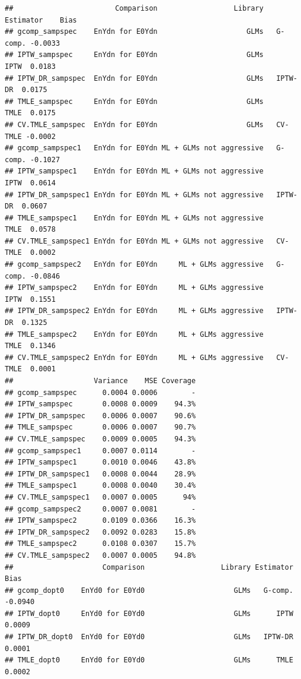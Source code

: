 \documentclass[11pt]{article}\usepackage[]{graphicx}\usepackage[]{color}
\makeatletter
\newenvironment{kframe}{%
 \def\at@end@of@kframe{}%
 \ifinner\ifhmode%
  \def\at@end@of@kframe{\end{minipage}}%
  \begin{minipage}{\columnwidth}%
 \fi\fi%
 \def\FrameCommand##1{\hskip\@totalleftmargin \hskip-\fboxsep
 \colorbox{shadecolor}{##1}\hskip-\fboxsep
     \hskip-\linewidth \hskip-\@totalleftmargin \hskip\columnwidth}%
 \MakeFramed {\advance\hsize-\width
   \@totalleftmargin\z@ \linewidth\hsize
   \@setminipage}}%
 {\par\unskip\endMakeFramed%
 \at@end@of@kframe}
\newenvironment{knitrout}{}{} %
\makeatother
\begin{document}
\begin{knitrout}
\color{fgcolor}\begin{kframe}
\begin{verbatim}
##                        Comparison                  Library Estimator    Bias
## gcomp_sampspec    EnYdn for E0Ydn                     GLMs   G-comp. -0.0033
## IPTW_sampspec     EnYdn for E0Ydn                     GLMs      IPTW  0.0183
## IPTW_DR_sampspec  EnYdn for E0Ydn                     GLMs   IPTW-DR  0.0175
## TMLE_sampspec     EnYdn for E0Ydn                     GLMs      TMLE  0.0175
## CV.TMLE_sampspec  EnYdn for E0Ydn                     GLMs   CV-TMLE -0.0002
## gcomp_sampspec1   EnYdn for E0Ydn ML + GLMs not aggressive   G-comp. -0.1027
## IPTW_sampspec1    EnYdn for E0Ydn ML + GLMs not aggressive      IPTW  0.0614
## IPTW_DR_sampspec1 EnYdn for E0Ydn ML + GLMs not aggressive   IPTW-DR  0.0607
## TMLE_sampspec1    EnYdn for E0Ydn ML + GLMs not aggressive      TMLE  0.0578
## CV.TMLE_sampspec1 EnYdn for E0Ydn ML + GLMs not aggressive   CV-TMLE  0.0002
## gcomp_sampspec2   EnYdn for E0Ydn     ML + GLMs aggressive   G-comp. -0.0846
## IPTW_sampspec2    EnYdn for E0Ydn     ML + GLMs aggressive      IPTW  0.1551
## IPTW_DR_sampspec2 EnYdn for E0Ydn     ML + GLMs aggressive   IPTW-DR  0.1325
## TMLE_sampspec2    EnYdn for E0Ydn     ML + GLMs aggressive      TMLE  0.1346
## CV.TMLE_sampspec2 EnYdn for E0Ydn     ML + GLMs aggressive   CV-TMLE  0.0001
##                   Variance    MSE Coverage
## gcomp_sampspec      0.0004 0.0006        -
## IPTW_sampspec       0.0008 0.0009    94.3%
## IPTW_DR_sampspec    0.0006 0.0007    90.6%
## TMLE_sampspec       0.0006 0.0007    90.7%
## CV.TMLE_sampspec    0.0009 0.0005    94.3%
## gcomp_sampspec1     0.0007 0.0114        -
## IPTW_sampspec1      0.0010 0.0046    43.8%
## IPTW_DR_sampspec1   0.0008 0.0044    28.9%
## TMLE_sampspec1      0.0008 0.0040    30.4%
## CV.TMLE_sampspec1   0.0007 0.0005      94%
## gcomp_sampspec2     0.0007 0.0081        -
## IPTW_sampspec2      0.0109 0.0366    16.3%
## IPTW_DR_sampspec2   0.0092 0.0283    15.8%
## TMLE_sampspec2      0.0108 0.0307    15.7%
## CV.TMLE_sampspec2   0.0007 0.0005    94.8%
##                     Comparison                  Library Estimator    Bias
## gcomp_dopt0    EnYd0 for E0Yd0                     GLMs   G-comp. -0.0940
## IPTW_dopt0     EnYd0 for E0Yd0                     GLMs      IPTW  0.0009
## IPTW_DR_dopt0  EnYd0 for E0Yd0                     GLMs   IPTW-DR  0.0001
## TMLE_dopt0     EnYd0 for E0Yd0                     GLMs      TMLE  0.0002

\end{verbatim}
\end{kframe}
\end{knitrout}
\end{document}
